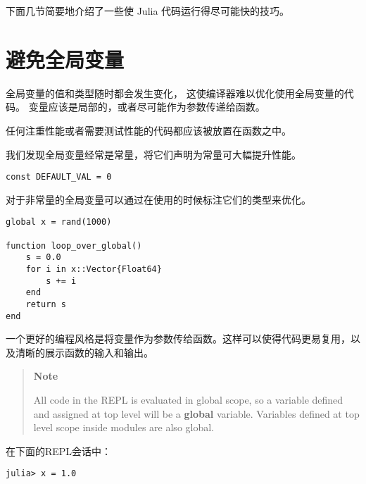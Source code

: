 下面几节简要地介绍了一些使 Julia 代码运行得尽可能快的技巧。



\hypertarget{14492220707033250800}{}


\section{避免全局变量}



全局变量的值和类型随时都会发生变化， 这使编译器难以优化使用全局变量的代码。 变量应该是局部的，或者尽可能作为参数传递给函数。



任何注重性能或者需要测试性能的代码都应该被放置在函数之中。



我们发现全局变量经常是常量，将它们声明为常量可大幅提升性能。




\begin{verbatim}
const DEFAULT_VAL = 0
\end{verbatim}



对于非常量的全局变量可以通过在使用的时候标注它们的类型来优化。




\begin{verbatim}
global x = rand(1000)

function loop_over_global()
    s = 0.0
    for i in x::Vector{Float64}
        s += i
    end
    return s
end
\end{verbatim}



一个更好的编程风格是将变量作为参数传给函数。这样可以使得代码更易复用，以及清晰的展示函数的输入和输出。



\begin{quote}
\textbf{Note}

All code in the REPL is evaluated in global scope, so a variable defined and assigned at top level will be a \textbf{global} variable. Variables defined at top level scope inside modules are also global.

\end{quote}


在下面的REPL会话中：




\begin{verbatim}
julia> x = 1.0
\end{verbatim}



